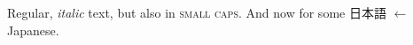 \documentclass{article}
\begin{document}
\setmainfont{CMU Serif}

Regular, \emph{italic} text, but also in \textsc{small caps}.
And now for some 日本語 $\leftarrow$ Japanese.
\end{document}

